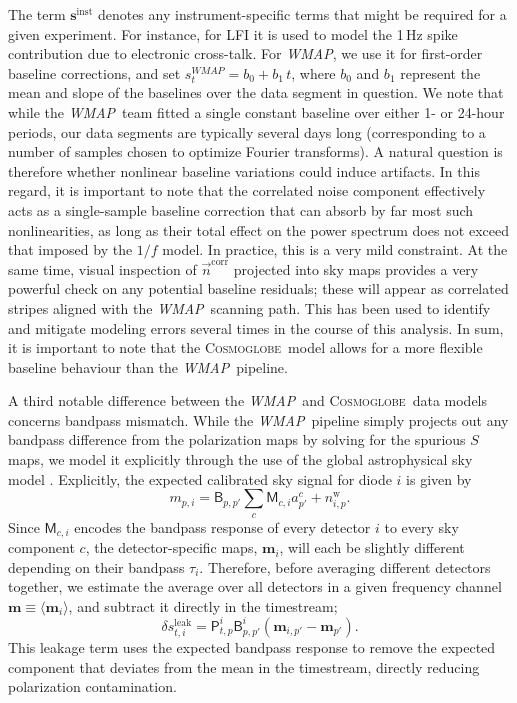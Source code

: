 \documentclass[twocolumn]{../../common/aa}
\def\WMAP{\emph{WMAP}}
\newcommand{\n}[0]{\vec{n}}
\newcommand{\cosmoglobe}{\textsc{Cosmoglobe}}
\begin{document}
The term $\boldsymbol s^\mathrm{inst}$ denotes any instrument-specific terms that might be required for a given experiment. For instance, for LFI it is used to model the 1\,Hz spike contribution due to electronic cross-talk. For \WMAP, we use it for first-order baseline corrections, and set $s^\mathit{WMAP}_t = b_0 + b_1\,t$, where $b_0$ and $b_1$ represent the mean and slope of the baselines over the data segment in question. We note that while the \WMAP\ team fitted a single constant baseline over either 1- or 24-hour periods, our data segments are typically several days long (corresponding to a number of samples chosen to optimize Fourier transforms). A natural question is therefore whether nonlinear baseline variations could induce artifacts. In this regard, it is important to note that the correlated noise component effectively acts as a single-sample baseline correction that can absorb by far most such nonlinearities, as long as their total effect on the power spectrum does not exceed that imposed by the $1/f$ model. In practice, this is a very mild constraint. At the same time, visual inspection of $\n^{\mathrm{corr}}$ projected into sky maps provides a very powerful check on any potential baseline residuals; these will appear as correlated stripes aligned with the \WMAP\ scanning path. This has been used to identify and mitigate modeling errors several times in the course of this analysis. In sum, it is important to note that the \cosmoglobe\ model allows for a more flexible baseline behaviour than the \WMAP\ pipeline.

A third notable difference between the \WMAP\ and \cosmoglobe\ data models concerns bandpass mismatch. While the \WMAP\ pipeline simply projects out any bandpass difference from the polarization maps by solving for the spurious $S$ maps, we model it explicitly through the use of the global astrophysical sky model \citep{bp09}. Explicitly, the expected calibrated sky signal for diode $i$ is given by
\begin{equation}
	m_{p,i}=\mathsf B_{p,p'}\sum_c\mathsf M_{c,i}a^c_{p'}+n_{i,p}^\mathrm w.
\end{equation}
Since $\mathsf M_{c,i}$ encodes the bandpass response of every detector $i$ to every sky component $c$, the detector-specific maps, $\boldsymbol m_i$, will each be slightly different depending on their bandpass $\tau_i$. Therefore, before averaging different detectors together, we estimate the average over all detectors in a given frequency channel $\boldsymbol m\equiv \langle \boldsymbol m_i\rangle$, and subtract it directly in the timestream;
\begin{equation}
	\delta s_{t,i}^\mathrm{leak}=\mathsf P_{t,p}^i\mathsf B_{p,p'}^i\left(\boldsymbol m_{i,p'}-\boldsymbol m_{p'}\right).
\end{equation}
This leakage term uses the expected bandpass response to remove the expected component that deviates from the mean in the timestream, directly reducing polarization contamination. 
\end{document}

